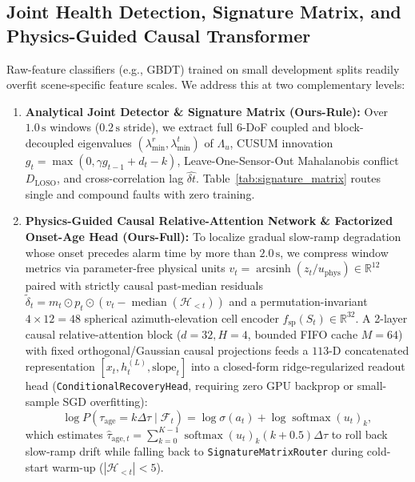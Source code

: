 \documentclass[journal]{IEEEtran}
\begin{document}
\subsection{Joint Health Detection, Signature Matrix, and Physics-Guided Causal Transformer}
Raw-feature classifiers (e.g., GBDT) trained on small development splits readily overfit scene-specific feature scales. We address this at two complementary levels:
\begin{enumerate}
    \item \textbf{Analytical Joint Detector \& Signature Matrix (Ours-Rule):} Over $1.0\,\mathrm{s}$ windows ($0.2\,\mathrm{s}$ stride), we extract full $6$-DoF coupled and block-decoupled eigenvalues $(\lambda_{\min}^r, \lambda_{\min}^t)$ of $\Lambda_u$, CUSUM innovation $g_t = \max(0, \gamma g_{t-1} + d_t - k)$, Leave-One-Sensor-Out Mahalanobis conflict $D_{\mathrm{LOSO}}$, and cross-correlation lag $\hat{\delta t}$. Table~\ref{tab:signature_matrix} routes single and compound faults with zero training.
    \item \textbf{Physics-Guided Causal Relative-Attention Network \& Factorized Onset-Age Head (Ours-Full):} To localize gradual slow-ramp degradation whose onset precedes alarm time by more than $2.0\,\mathrm{s}$, we compress window metrics via parameter-free physical units $v_t = \operatorname{arcsinh}(z_t / u_{\mathrm{phys}}) \in \mathbb{R}^{12}$ paired with strictly causal past-median residuals $\tilde{\delta}_t = m_t \odot p_t \odot (v_t - \operatorname{median}(\mathcal{H}_{<t}))$ and a permutation-invariant $4\times 12 = 48$ spherical azimuth-elevation cell encoder $f_{\mathrm{sp}}(S_t) \in \mathbb{R}^{32}$. A 2-layer causal relative-attention block ($d=32, H=4$, bounded FIFO cache $M=64$) with fixed orthogonal/Gaussian causal projections feeds a $113$-D concatenated representation $[x_t, h_t^{(L)}, \text{slope}_t]$ into a closed-form ridge-regularized readout head (\texttt{ConditionalRecoveryHead}, requiring zero GPU backprop or small-sample SGD overfitting):
    \begin{equation}
        \log P(\tau_{\mathrm{age}}\!=\!k\Delta\tau \mid \mathcal{F}_t) = \log\sigma(a_t) + \log\operatorname{softmax}(u_t)_k,
    \end{equation}
    which estimates $\hat{\tau}_{\mathrm{age},t} = \sum_{k=0}^{K-1} \operatorname{softmax}(u_t)_k (k+0.5)\Delta\tau$ to roll back slow-ramp drift while falling back to \texttt{SignatureMatrixRouter} during cold-start warm-up ($|\mathcal{H}_{<t}| < 5$).
\end{enumerate}
\end{document}
